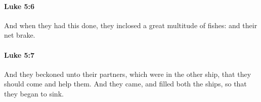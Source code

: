 		\paragraph{Luke 5:6} %
			\label{LUKE-5-6}

			And when they had this done, they inclosed a great multitude of fishes: and their net brake.

			\begin{framed}
			\scriptsize
				\begin{compactdesc}
					\item[SBLG] 
				\end{compactdesc}
			\end{framed}

		\paragraph{Luke 5:7} %
			\label{LUKE-5-7}

			And they beckoned unto their partners, which were in the other ship, that they should come and help them. And they came, and filled both the ships, so that they began to sink.

